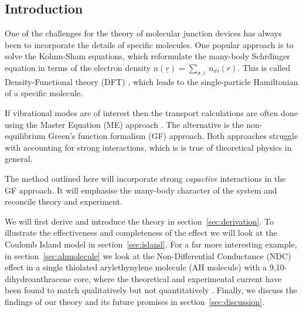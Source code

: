 \documentclass{article}
\begin{document}
\begin{multicols}{2}
    
    \section{Introduction}
        One of the challenges for the theory of molecular junction devices has always been to incorporate the details of specific molecules. One popular approach is to solve the Kohnn-Sham equations\cite{kohnsham}, which reformulate the many-body Schr\"dinger equation in terms of the electron density $n(\underline{r})=\sum_{\sigma,i}\:n_{\sigma i}(r)$. This is called Density-Functional theory (DFT) \cite{nobel1998}, which leads to the single-particle Hamiltonian of a specific molecule.  
        
        If vibrational modes are of interest then the transport calculations are often done using the Master Equation (ME) approach \cite{beenakker}. The alternative is the non-equilibrium Green's function formalism (GF) approach. Both approaches struggle with accounting for strong interactions, which is is true of theoretical physics in general. 
        
        The method outlined here will incorporate strong \emph{capactive} interactions in the GF approach. It will emphasise the many-body character of the system and reconcile theory and experiment.
        
        We will first derive and introduce the theory in section~\ref{sec:derivation}. To illustrate the effectiveness and completeness of the effect we will look at the Coulomb Island model in section~\ref{sec:island}. For a far more interesting example, in section~\ref{sec:ahmolecule} we look at the Non-Differential Conductance (NDC) effect in a single thiolated arylethynylene molecule (AH molecule) with a 9,10-dihydroanthracene core, where the theoretical and experimental current have been found to match qualitatively but not quantitatively \cite{perrinnano}. Finally, we discuss the findings of our theory and its future promises in section~\ref{sec:discussion}.
    

\end{multicols}
\end{document}
